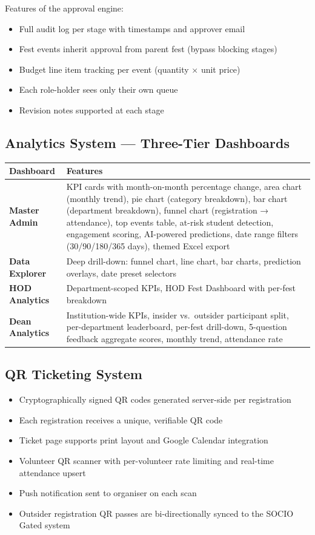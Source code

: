 \documentclass[12pt,a4paper]{article}
\begin{document}
Features of the approval engine:
\begin{itemize}[leftmargin=*]
    \item Full audit log per stage with timestamps and approver email
    \item Fest events inherit approval from parent fest (bypass blocking stages)
    \item Budget line item tracking per event (quantity × unit price)
    \item Each role-holder sees only their own queue
    \item Revision notes supported at each stage
\end{itemize}

\subsection{Analytics System — Three-Tier Dashboards}

\begin{tabularx}{\textwidth}{L{3cm} X}
\toprule
{}
\textbf{Dashboard} & \textbf{Features} \\
\midrule
\textbf{Master Admin} & KPI cards with month-on-month percentage change, area chart (monthly trend), pie chart (category breakdown), bar chart (department breakdown), funnel chart (registration → attendance), top events table, at-risk student detection, engagement scoring, AI-powered predictions, date range filters (30/90/180/365 days), themed Excel export \\
\addlinespace
\textbf{Data Explorer} & Deep drill-down: funnel chart, line chart, bar charts, prediction overlays, date preset selectors \\
\addlinespace
\textbf{HOD Analytics} & Department-scoped KPIs, HOD Fest Dashboard with per-fest breakdown \\
\addlinespace
\textbf{Dean Analytics} & Institution-wide KPIs, insider vs.\ outsider participant split, per-department leaderboard, per-fest drill-down, 5-question feedback aggregate scores, monthly trend, attendance rate \\
\bottomrule
\end{tabularx}

\subsection{QR Ticketing System}

\begin{itemize}[leftmargin=*]
    \item Cryptographically signed QR codes generated server-side per registration
    \item Each registration receives a unique, verifiable QR code
    \item Ticket page supports print layout and Google Calendar integration
    \item Volunteer QR scanner with per-volunteer rate limiting and real-time attendance upsert
    \item Push notification sent to organiser on each scan
    \item Outsider registration QR passes are bi-directionally synced to the SOCIO Gated system
\end{itemize}
\end{document}
